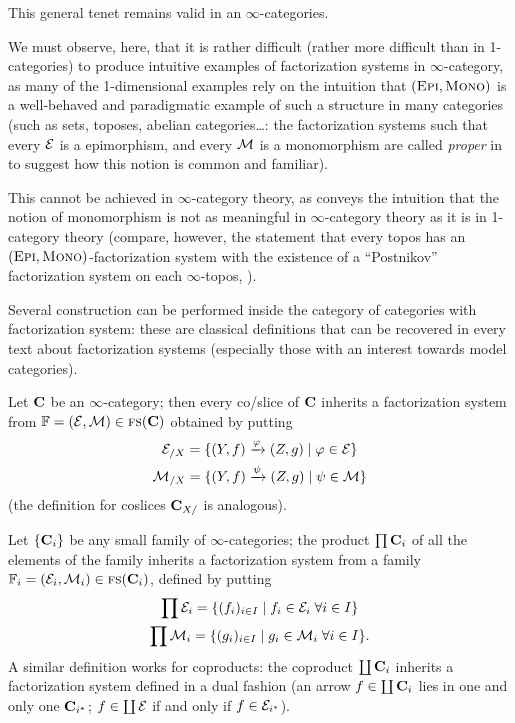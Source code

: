 This general tenet remains valid in an $\infty$\hyp{}categories.
\begin{remark}\label{no.easy.examples}
We must observe, here, that it is rather difficult (\ie rather more difficult than in 1\hyp{}categories) to produce intuitive examples of factorization systems in $\infty$\hyp{}category, as many of the 1\hyp{}dimensional examples rely on the intuition that $(\text{\scshape Epi}, \text{\scshape Mono})$ is a well\hyp{}behaved and paradigmatic example of such a structure in many categories (such as sets, toposes, abelian categories\dots: the factorization systems such that every $\mathcal{E}$ is a epimorphism, and every $\mathcal{M}$ is a monomorphism are called \emph{proper} in \cite{FK,kelly1980unified} to suggest how this notion is common and familiar).

This cannot be achieved in $\infty$\hyp{}category theory, as \cite[p. 562]{HTT} conveys the intuition that the notion of monomorphism is not as meaningful in $\infty$\hyp{}category theory as it is in 1\hyp{}category theory (compare, however, the statement that every topos has an $(\text{\scshape Epi}, \text{\scshape Mono})$\hyp{}factorization system with the existence of a ``Postnikov'' factorization system on each $\infty$\hyp{}topos, \cite{HTT}).
\end{remark}
Several construction can be performed inside the category of categories with factorization system: these are classical definitions that can be recovered in every text about factorization systems (especially those with an interest towards model categories). 
\begin{example}\label{prod.of.fact}
Let $\mathbf{C}$ be an $\infty$\hyp{}category; then every co\fshyp{}slice of $\mathbf{C}$ inherits a factorization system from $\mathbb{F} = (\mathcal{E},\mathcal{M})\in\text{\scshape fs}(\mathbf{C})$ obtained by putting
\begin{gather}
\mathcal{E}_{/X} = \{(Y,f) \xrightarrow{\varphi}(Z,g)\mid \varphi \in \mathcal{E} \}\notag\\
\mathcal{M}_{/X} = \{(Y,f)\xrightarrow{\psi}(Z,g)\mid \psi \in \mathcal{M} \}
\end{gather}
(the definition for coslices $\mathbf{C}_{X/}$ is analogous).

Let $\{\mathbf{C}_i\}$ be any small family of $\infty$\hyp{}categories; the product $\prod \mathbf{C}_i$ of all the elements of the family inherits a factorization system from a family $\mathbb{F}_i = (\mathcal{E}_i,\mathcal{M}_i)\in\text{\scshape fs}(\mathbf{C}_i)$, defined by putting
\begin{gather}
\prod \mathcal{E}_i = \{ (f_i)_{i\in I}\mid f_i\in\mathcal{E}_i\; \forall i\in I \}\notag\\
\prod \mathcal{M}_i = \{ (g_i)_{i\in I}\mid g_i\in\mathcal{M}_i\; \forall i\in I \}.
\end{gather}
A similar definition works for coproducts: the coproduct $\coprod \mathbf{C}_i$ inherits a factorization system defined in a dual fashion (an arrow $f\in\coprod \mathbf{C}_i$ lies in one and only one $\mathbf{C}_{i^*}$; $f\in\coprod \mathcal{E}$ if and only if $f\in \mathcal{E}_{i^*}$).
\end{example}
